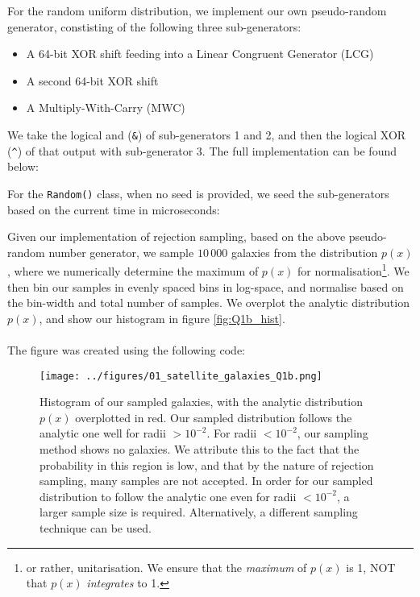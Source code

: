 \begin{enumerate}[label=(\alph*)]
{For the random uniform distribution, we implement our own pseudo-random generator, constisting of the following three sub-generators:
\begin{itemize}
    \item A 64-bit XOR shift feeding into a Linear Congruent Generator (LCG)
    \item A second 64-bit XOR shift
    \item A Multiply-With-Carry (MWC)
\end{itemize}
We take the logical and (\verb|&|) of sub-generators 1 and 2, and then the logical XOR (\verb|^|) of that output with sub-generator 3. The full implementation can be found below:

For the \verb|Random()| class, when no seed is provided, we seed the sub-generators based on the current time in microseconds:

Given our implementation of rejection sampling, based on the above pseudo-random number generator, we sample $10\,000$ galaxies from the distribution $p(x)$, where we numerically determine the maximum of $p(x)$ for normalisation\footnote{or rather, unitarisation. We ensure that the \textit{maximum} of $p(x)$ is 1, NOT that $p(x)$ \textit{integrates} to 1.}. We then bin our samples in evenly spaced bins in log-space, and normalise based on the bin-width and total number of samples. We overplot the analytic distribution $p(x)$, and show our histogram in figure \ref{fig:Q1b_hist}.\\
\\
The figure was created using the following code:

\begin{figure}[H]
    \centering
    \texttt{[image: ../figures/01\_satellite\_galaxies\_Q1b.png]}
    \caption{Histogram of our sampled galaxies, with the analytic distribution $p(x)$ overplotted in red. Our sampled distribution follows the analytic one well for radii $>10^{-2}$. For radii $<10^{-2}$, our sampling method shows no galaxies. We attribute this to the fact that the probability in this region is low, and that by the nature of rejection sampling, many samples are not accepted. In order for our sampled distribution to follow the analytic one even for radii $<10^{-2}$, a larger sample size is required. Alternatively, a different sampling technique can be used.}

\end{figure}}
\end{enumerate}
